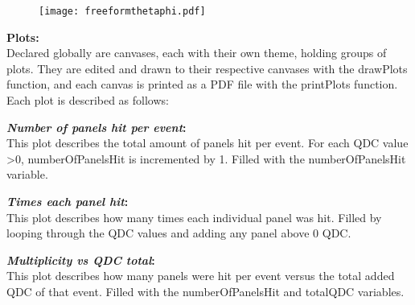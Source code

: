 \documentclass[a4paper,12pt]{article}
\begin{document}
\begin{figure}[h]
\centering
\texttt{[image: freeformthetaphi.pdf]}
\end{figure}


\pagebreak

\textbf{Plots:} \\
Declared globally are canvases, each with their own theme, holding groups of plots. They are edited and drawn to their respective canvases with the drawPlots function, and each canvas is printed as a PDF file with the printPlots function. Each plot is described as follows: \\

\begin{figure}[h]
\centering
{}%
\end{figure}

\textbf{\emph{Number of panels hit per event}:}  \\
This plot describes the total amount of panels hit per event. For each QDC value >0, numberOfPanelsHit is incremented by 1. Filled with the numberOfPanelsHit variable.

\textbf{\emph{Times each panel hit}:} \\
This plot describes how many times each individual panel was hit. Filled by looping through the QDC values and adding any panel above 0 QDC.

\textbf{\emph{Multiplicity vs QDC total}:} \\
This plot describes how many panels were hit per event versus the total added QDC of that event. Filled with the numberOfPanelsHit and totalQDC variables.
\end{document}
